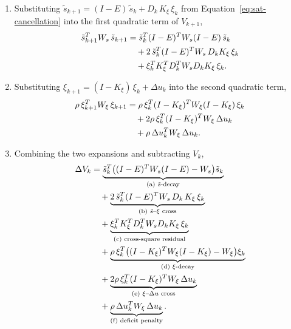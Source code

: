 \documentclass[conf]{new-aiaa}
\begin{document}
\begin{enumerate}
\item Substituting $\tilde s_{k+1} = (I-E)\, \tilde s_k + D_k\, K_\xi\, \xi_k$ from Equation~\ref{eq:sat-cancellation} into the first quadratic term of $V_{k+1}$,
\small
\begin{align}
\tilde s_{k+1}^T W_s\, \tilde s_{k+1}
&= \tilde s_k^T (I-E)^T W_s (I-E)\, \tilde s_k \notag \\
&\quad + 2\, \tilde s_k^T (I-E)^T W_s\, D_k K_\xi\, \xi_k \notag \\
&\quad + \xi_k^T K_\xi^T D_k^T W_s D_k K_\xi\, \xi_k.
\end{align}
\normalsize

\item Substituting $\xi_{k+1} = (I - K_\xi)\, \xi_k + \Delta u_k$ into the second quadratic term,
\small
\begin{align}
\rho\, \xi_{k+1}^T W_\xi\, \xi_{k+1}
&= \rho\, \xi_k^T (I-K_\xi)^T W_\xi (I-K_\xi)\, \xi_k \notag \\
&\quad + 2\rho\, \xi_k^T (I-K_\xi)^T W_\xi\, \Delta u_k \notag \\
&\quad + \rho\, \Delta u_k^T W_\xi\, \Delta u_k.
\end{align}
\normalsize

\item Combining the two expansions and subtracting $V_k$,
\small
\begingroup
\setlength{\jot}{1pt}
\begin{align}
\Delta V_k
&= \underbrace{\tilde s_k^T \bigl( (I-E)^T W_s (I-E) - W_s \bigr) \tilde s_k}_{\text{(a) $\tilde s$-decay}} \notag \\
&\quad + \underbrace{2\, \tilde s_k^T (I-E)^T W_s\, D_k\, K_\xi\, \xi_k}_{\text{(b) $\tilde s$–$\xi$ cross}} \notag \\
&\quad + \underbrace{\xi_k^T K_\xi^T D_k^T W_s D_k K_\xi\, \xi_k}_{\text{(c) cross-square residual}} \notag \\
&\quad + \underbrace{\rho\, \xi_k^T \bigl( (I-K_\xi)^T W_\xi (I-K_\xi) - W_\xi \bigr) \xi_k}_{\text{(d) $\xi$-decay}} \notag \\
&\quad + \underbrace{2 \rho\, \xi_k^T (I-K_\xi)^T W_\xi\, \Delta u_k}_{\text{(e) $\xi$–$\Delta u$ cross}} \notag \\
\label{eq:sat-DV}
&\quad + \underbrace{\rho\, \Delta u_k^T W_\xi\, \Delta u_k}_{\text{(f) deficit penalty}}.
\end{align}
\endgroup
\normalsize


\end{enumerate}
\end{document}
